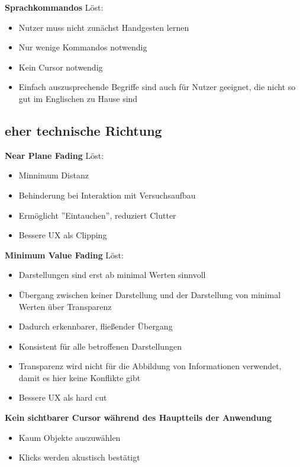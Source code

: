 \textbf{Sprachkommandos}
Löst: 
\begin{itemize}
	\item Nutzer muss nicht zunächst Handgesten lernen
	\item Nur wenige Kommandos notwendig
	\item Kein Cursor notwendig
	\item Einfach auszusprechende Begriffe sind auch für Nutzer geeignet, die nicht so gut im Englischen zu Hause sind
\end{itemize}

\subsection{eher technische Richtung}

\textbf{Near Plane Fading}
Löst: 
\begin{itemize}
	\item Minnimum Distanz
	\item Behinderung bei Interaktion mit Versuchsaufbau
	\item Ermöglicht ''Eintauchen'', reduziert Clutter
	\item Bessere UX als Clipping
\end{itemize}

\textbf{Minimum Value Fading}
Löst: 
\begin{itemize}
	\item Darstellungen sind erst ab minimal Werten sinnvoll
	\item Übergang zwischen keiner Darstellung und der Darstellung von minimal Werten über Transparenz
	\item Dadurch erkennbarer, fließender Übergang
	\item Konsistent für alle betroffenen Darstellungen
	\item Transparenz wird nicht für die Abbildung von Informationen verwendet, damit es hier keine Konflikte gibt
	\item Bessere UX als hard cut
\end{itemize}

\textbf{Kein sichtbarer Cursor während des Hauptteils der Anwendung}
\begin{itemize}
	\item Kaum Objekte auszuwählen
	\item Klicks werden akustisch bestätigt
\end{itemize}

